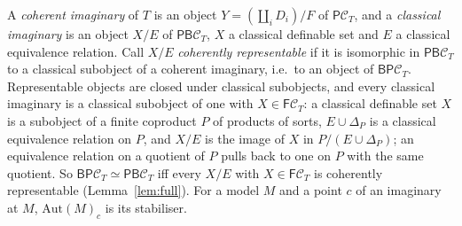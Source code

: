 \documentclass[11pt]{amsart}
\theoremstyle{definition}
\newcommand{\FF}{\mathsf F}
\newcommand{\PP}{\mathsf P}
\newcommand{\BB}{\mathsf B}
\newcommand{\cC}{\mathcal C}
\begin{document}
A \emph{coherent imaginary} of $T$ is an object $Y=(\coprod_i D_i)/F$ of
$\PP\cC_T$, and a \emph{classical imaginary} is an object $X/E$ of
$\PP\BB\cC_T$, $X$ a classical definable set and $E$ a classical
equivalence relation. Call $X/E$ \emph{coherently representable} if it
is isomorphic in $\PP\BB\cC_T$ to a classical subobject of a coherent
imaginary, i.e.\ to an object of $\BB\PP\cC_T$. Representable objects
are closed under classical subobjects, and every classical imaginary is
a classical subobject of one with $X\in\FF\cC_T$: a classical definable
set $X$ is a subobject of a finite coproduct $P$ of products of sorts,
$E\cup\Delta_P$ is a classical equivalence relation on $P$, and $X/E$ is
the image of $X$ in $P/(E\cup\Delta_P)$; an equivalence relation on a
quotient of $P$ pulls back to one on $P$ with the same quotient. So
$\BB\PP\cC_T\simeq\PP\BB\cC_T$ iff every $X/E$ with $X\in\FF\cC_T$ is
coherently representable (Lemma~\ref{lem:full}). For a model $M$ and a
point $c$ of an imaginary at $M$, $\mathrm{Aut}(M)_c$ is its stabiliser.
\end{document}
